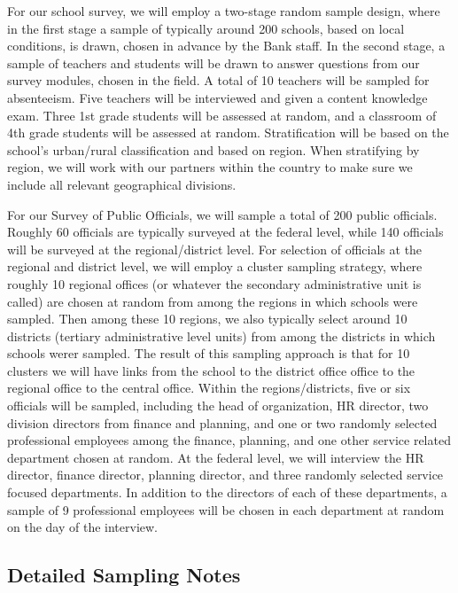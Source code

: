 \documentclass[]{article}
\begin{document}
For our school survey, we will employ a two-stage random sample design,
where in the first stage a sample of typically around 200 schools, based
on local conditions, is drawn, chosen in advance by the Bank staff. In
the second stage, a sample of teachers and students will be drawn to
answer questions from our survey modules, chosen in the field. A total
of 10 teachers will be sampled for absenteeism. Five teachers will be
interviewed and given a content knowledge exam. Three 1st grade students
will be assessed at random, and a classroom of 4th grade students will
be assessed at random. Stratification will be based on the school's
urban/rural classification and based on region. When stratifying by
region, we will work with our partners within the country to make sure
we include all relevant geographical divisions.

For our Survey of Public Officials, we will sample a total of 200 public
officials. Roughly 60 officials are typically surveyed at the federal
level, while 140 officials will be surveyed at the regional/district
level. For selection of officials at the regional and district level, we
will employ a cluster sampling strategy, where roughly 10 regional
offices (or whatever the secondary administrative unit is called) are
chosen at random from among the regions in which schools were sampled.
Then among these 10 regions, we also typically select around 10
districts (tertiary administrative level units) from among the districts
in which schools werer sampled. The result of this sampling approach is
that for 10 clusters we will have links from the school to the district
office office to the regional office to the central office. Within the
regions/districts, five or six officials will be sampled, including the
head of organization, HR director, two division directors from finance
and planning, and one or two randomly selected professional employees
among the finance, planning, and one other service related department
chosen at random. At the federal level, we will interview the HR
director, finance director, planning director, and three randomly
selected service focused departments. In addition to the directors of
each of these departments, a sample of 9 professional employees will be
chosen in each department at random on the day of the interview.

\hypertarget{detailed-sampling-notes}{%
\subsection{Detailed Sampling Notes}\label{detailed-sampling-notes}}
\end{document}
